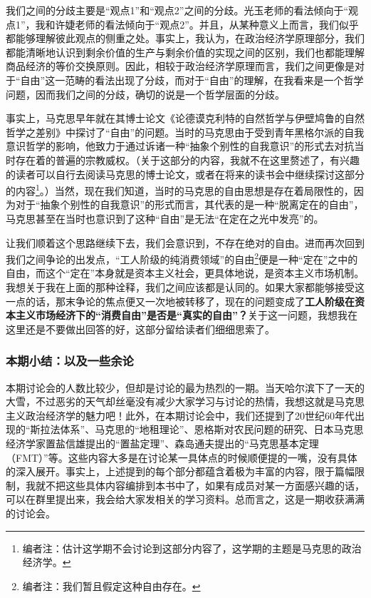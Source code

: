 \documentclass[a4paper,twoside,12pt,AutoFakeBold]{ctexart}
\begin{document}
我们之间的分歧主要是“观点1”和“观点2”之间的分歧。光玉老师的看法倾向于“观点1”，我和许婕老师的看法倾向于“观点2”。并且，从某种意义上而言，我们似乎都能够理解彼此观点的侧重之处。事实上，我认为，在政治经济学原理部分，我们都能清晰地认识到剩余价值的生产与剩余价值的实现之间的区别，我们也都能理解商品经济的等价交换原则。因此，相较于政治经济学原理而言，我们之间更像是对于“自由”这一范畴的看法出现了分歧，而对于“自由”的理解，在我看来是一个哲学问题，因而我们之间的分歧，确切的说是一个哲学层面的分歧。

事实上，马克思早年就在其博士论文《论德谟克利特的自然哲学与伊壁鸠鲁的自然哲学之差别》中探讨了“自由”的问题。当时的马克思由于受到青年黑格尔派的自我意识哲学的影响，他致力于通过诉诸一种“抽象个别性的自我意识”的形式去对抗当时存在着的普遍的宗教威权。（关于这部分的内容，我就不在这里赘述了，有兴趣的读者可以自行去阅读马克思的博士论文，或者在将来的读书会中继续探讨这部分的内容\footnote{编者注：估计这学期不会讨论到这部分内容了，这学期的主题是马克思的政治经济学。}。）当然，现在我们知道，当时的马克思的自由思想是存在着局限性的，因为对于“抽象个别性的自我意识”的形式而言，其代表的是一种“脱离定在的自由”，马克思甚至在当时也意识到了这种“自由”是无法“在定在之光中发亮”的。

让我们顺着这个思路继续下去，我们会意识到，不存在绝对的自由。进而再次回到我们之间争论的出发点，“工人阶级的纯消费领域”的自由\footnote{编者注：我们暂且假定这种自由存在。}便是一种“定在”之中的自由，而这个“定在”本身就是资本主义社会，更具体地说，是资本主义市场机制。我想关于我在上面的那种诠释，我们之间应该都是认同的。如果大家都能够接受这一点的话，那末争论的焦点便又一次地被转移了，现在的问题变成了\textbf{工人阶级在资本主义市场经济下的“消费自由”是否是“真实的自由”？}关于这一问题，我想我在这里还是不要做出回答的好，这部分留给读者们细细思索了。

\subsubsection{本期小结：以及一些余论}
本期讨论会的人数比较少，但却是讨论的最为热烈的一期。当天哈尔滨下了一天的大雪，不过恶劣的天气却丝毫没有减少大家学习与讨论的热情，我想这就是马克思主义政治经济学的魅力吧！此外，在本期讨论会中，我们还提到了20世纪60年代出现的“斯拉法体系”、马克思的“地租理论”、恩格斯对农民问题的研究、日本马克思经济学家置盐信雄提出的“置盐定理”、森岛通夫提出的“马克思基本定理（FMT）”等。这些内容大多是在讨论某一具体点的时候顺便提的一嘴，没有具体的深入展开。事实上，上述提到的每个部分都蕴含着极为丰富的内容，限于篇幅限制，我就不把这些具体内容编排到本书中了，如果有成员对某一方面感兴趣的话，可以在群里提出来，我会给大家发相关的学习资料。总而言之，这是一期收获满满的讨论会。
\end{document}
